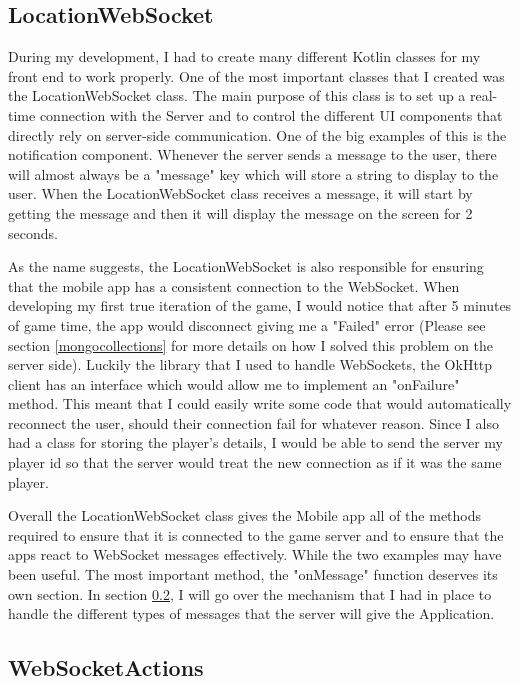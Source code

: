 \documentclass{l4proj}
\begin{document}
\subsection{LocationWebSocket}
During my development, I had to create many different Kotlin classes for my front end to work properly.
One of the most important classes that I created was the LocationWebSocket class. The main purpose of this class is to set up a
real-time connection with the Server and to control the different UI components that directly rely on server-side communication.
One of the big examples of this is the notification component. Whenever the server sends a message to the user, there will almost
always be a "message" key which will store a string to display to the user. When the LocationWebSocket class receives a message, it 
will start by getting the message and then it will display the message on the screen for 2 seconds.

As the name suggests, the LocationWebSocket is also responsible for ensuring that the mobile app has a consistent connection to the
WebSocket. When developing my first true iteration of the game, I would notice that after 5 minutes of game time, 
the app would disconnect giving me a "Failed" error (Please see section \ref{mongocollections} for more details on how I solved this problem on the server side). 
Luckily the library that I used to handle WebSockets, the OkHttp client \citep{okhttp} has an
interface which would allow me to implement an "onFailure" method. This meant that I could easily write some code that would automatically
reconnect the user, should their connection fail for whatever reason. Since I also had a class for storing the player's
details, I would be able to send the server my player id so that the server would treat the new connection as if it was
the same player.

Overall the LocationWebSocket class gives the Mobile app all of the methods required to ensure that it is connected to the game
server and to ensure that the apps react to WebSocket messages effectively. While the two examples may have been useful. The most
important method, the "onMessage" function deserves its own section. In section \ref{websocketactions}, I will go over the mechanism
that I had in place to handle the different types of messages that the server will give the Application.

\subsection{WebSocketActions}
\label{websocketactions}
\end{document}
